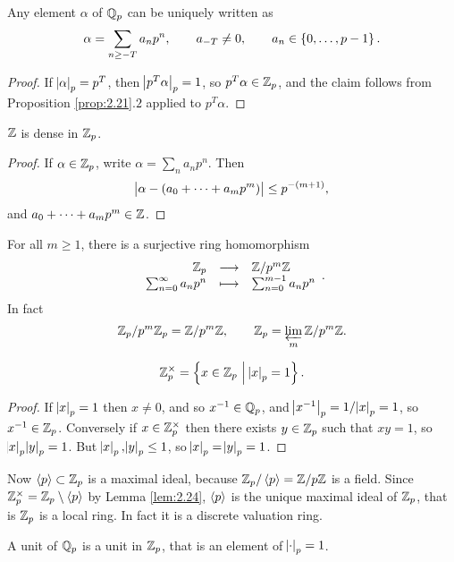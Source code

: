 \begin{corollary}
Any element $ \alpha $ of $ \mathbb{Q}_p $ can be uniquely written as
$$ \alpha = \sum_{n \ge -T} a_np^n, \qquad a_{-T} \ne 0, \qquad a_n \in \cbr{0, \dots, p - 1}. $$
\end{corollary}

\begin{proof}
If $ \abs{\alpha}_p = p^T $, then $ \abs{p^T\alpha}_p = 1 $, so $ p^T\alpha \in \mathbb{Z}_p $, and the claim follows from Proposition \ref{prop:2.21}.$ 2 $ applied to $ p^T\alpha $.
\end{proof}

\begin{corollary}
$ \mathbb{Z} $ is dense in $ \mathbb{Z}_p $.
\end{corollary}

\begin{proof}
If $ \alpha \in \mathbb{Z}_p $, write $ \alpha = \sum_n a_np^n $. Then
$$ \abs{\alpha - \br{a_0 + \dots + a_mp^m}} \le p^{-\br{m + 1}}, $$
and $ a_0 + \dots + a_mp^m \in \mathbb{Z} $.
\end{proof}

\pagebreak

For all $ m \ge 1 $, there is a surjective ring homomorphism
$$ \function{\ZZ_p}{\ZZ / p^m\ZZ}{\sum_{n = 0}^\infty a_np^n}{\sum_{n = 0}^{m - 1} a_np^n}. $$
In fact
$$ \mathbb{Z}_p / p^m\mathbb{Z}_p = \mathbb{Z} / p^m\mathbb{Z}, \qquad \mathbb{Z}_p = \varprojlim_m \mathbb{Z} / p^m\mathbb{Z}. $$

\begin{lemma}
\label{lem:2.24}
$$ \ZZ_p^\times = \cbr{x \in \ZZ_p \st \abs{x}_p = 1}. $$
\end{lemma}

\begin{proof}
If $ \abs{x}_p = 1 $ then $ x \ne 0 $, and so $ x^{-1} \in \mathbb{Q}_p $, and $ \abs{x^{-1}}_p = 1 / \abs{x}_p = 1 $, so $ x^{-1} \in \mathbb{Z}_p $. Conversely if $ x \in \mathbb{Z}_p^\times $ then there exists $ y \in \mathbb{Z}_p $ such that $ xy = 1 $, so $ \abs{x}_p\abs{y}_p = 1 $. But $ \abs{x}_p, \abs{y}_p \le 1 $, so $ \abs{x}_p = \abs{y}_p = 1 $.
\end{proof}

Now $ \left\langle p \right\rangle \subset \mathbb{Z}_p $ is a maximal ideal, because $ \mathbb{Z}_p / \left\langle p \right\rangle = \mathbb{Z} / p\mathbb{Z} $ is a field. Since $ \mathbb{Z}_p^\times = \mathbb{Z}_p \setminus \left\langle p \right\rangle $ by Lemma \ref{lem:2.24}, $ \left\langle p \right\rangle $ is the unique maximal ideal of $ \mathbb{Z}_p $, that is $ \mathbb{Z}_p $ is a local ring. In fact it is a discrete valuation ring.

\begin{notation*}
A unit of $ \mathbb{Q}_p $ is a unit in $ \mathbb{Z}_p $, that is an element of $ \abs{\cdot}_p = 1 $.
\end{notation*}


